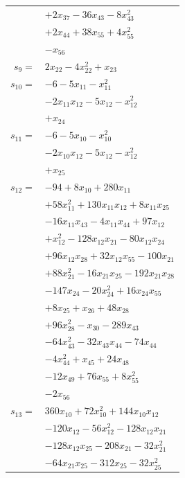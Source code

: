 \begin{longtable}{@{}r@{\;}l@{}}
 & \(\displaystyle +2x_{37} -36x_{43} -8x_{43}^{2}\) \\
 & \(\displaystyle +2x_{44} +38x_{55} +4x_{55}^{2}\) \\
 & \(\displaystyle -x_{56}\) \\[3pt]
\(s_{9}=\) & \(\displaystyle 2x_{22} -4x_{22}^{2} +x_{23}\) \\[3pt]
\(s_{10}=\) & \(\displaystyle -6 -5x_{11} -x_{11}^{2}\) \\
 & \(\displaystyle -2x_{11}x_{12} -5x_{12} -x_{12}^{2}\) \\
 & \(\displaystyle +x_{24}\) \\[3pt]
\(s_{11}=\) & \(\displaystyle -6 -5x_{10} -x_{10}^{2}\) \\
 & \(\displaystyle -2x_{10}x_{12} -5x_{12} -x_{12}^{2}\) \\
 & \(\displaystyle +x_{25}\) \\[3pt]
\(s_{12}=\) & \(\displaystyle -94 +8x_{10} +280x_{11}\) \\
 & \(\displaystyle +58x_{11}^{2} +130x_{11}x_{12} +8x_{11}x_{25}\) \\
 & \(\displaystyle -16x_{11}x_{43} -4x_{11}x_{44} +97x_{12}\) \\
 & \(\displaystyle +x_{12}^{2} -128x_{12}x_{21} -80x_{12}x_{24}\) \\
 & \(\displaystyle +96x_{12}x_{28} +32x_{12}x_{55} -100x_{21}\) \\
 & \(\displaystyle +88x_{21}^{2} -16x_{21}x_{25} -192x_{21}x_{28}\) \\
 & \(\displaystyle -147x_{24} -20x_{24}^{2} +16x_{24}x_{55}\) \\
 & \(\displaystyle +8x_{25} +x_{26} +48x_{28}\) \\
 & \(\displaystyle +96x_{28}^{2} -x_{30} -289x_{43}\) \\
 & \(\displaystyle -64x_{43}^{2} -32x_{43}x_{44} -74x_{44}\) \\
 & \(\displaystyle -4x_{44}^{2} +x_{45} +24x_{48}\) \\
 & \(\displaystyle -12x_{49} +76x_{55} +8x_{55}^{2}\) \\
 & \(\displaystyle -2x_{56}\) \\[3pt]
\(s_{13}=\) & \(\displaystyle 360x_{10} +72x_{10}^{2} +144x_{10}x_{12}\) \\
 & \(\displaystyle -120x_{12} -56x_{12}^{2} -128x_{12}x_{21}\) \\
 & \(\displaystyle -128x_{12}x_{25} -208x_{21} -32x_{21}^{2}\) \\
 & \(\displaystyle -64x_{21}x_{25} -312x_{25} -32x_{25}^{2}\) \\

\end{longtable}
